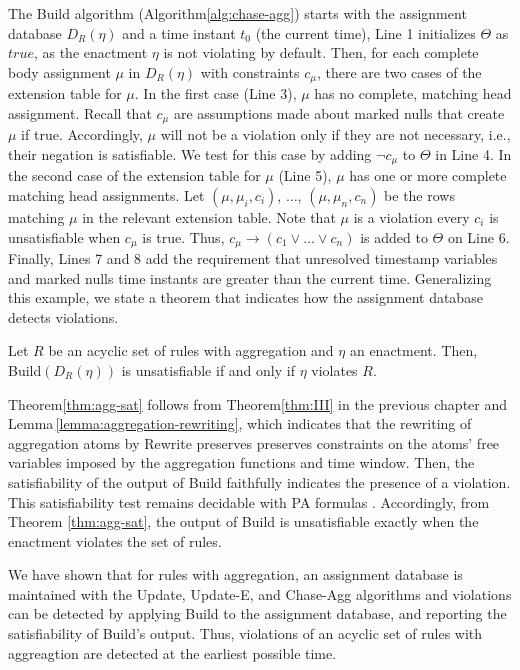 The {\sf Build} algorithm (Algorithm\:\ref{alg:chase-agg})
starts with the assignment database $D_{R}(\eta)$ 
and a time instant $t_0$ (the current time),
Line 1 initializes $\Theta$ as $true$,
as the enactment $\eta$ is not violating by default.
Then, for each complete body assignment $\mu$ in $D_{R}(\eta)$
with constraints $c_\mu$,
there are two cases of the extension table for $\mu$.
In the first case (Line 3),
$\mu$ has no complete, matching head assignment.
Recall that $c_\mu$ are assumptions made about marked nulls
that create $\mu$ if true.
Accordingly,
$\mu$ will not be a violation only if they are not necessary,
i.e., their negation is satisfiable.
We test for this case by adding $\neg c_\mu$ to $\Theta$ in Line 4.
In the second case of the extension table for $\mu$ (Line 5),
$\mu$ has one or more complete matching head assignments.
Let $(\mu,\mu_i,c_i)$, $\dots$, $(\mu,\mu_n,c_n)$
be the rows matching $\mu$ in the relevant extension table.
Note that $\mu$ is a violation
every $c_i$ is unsatisfiable when $c_\mu$ is true.
Thus, $c_\mu\rightarrow(c_1 \lor\dots\lor c_n)$
is added to $\Theta$ on Line 6.
Finally, Lines 7 and 8 add the requirement
that unresolved timestamp variables and marked nulls time instants
are greater than the current time.
Generalizing this example,
we state a theorem that indicates how the assignment database
detects violations.

\begin{thm}\label{thm:agg-sat}
    Let $R$ be an acyclic set of rules with aggregation
    and
    $\eta$ an enactment.
    Then,
    {\sf Build}$(D_R(\eta))$ is unsatisfiable
    if and only if $\eta$ violates $R$.
  \end{thm}

Theorem\:\ref{thm:agg-sat} follows from Theorem\:\ref{thm:III}
in the previous chapter
and Lemma\,\ref{lemma:aggregation-rewriting},
which indicates that the rewriting of aggregation atoms
by {\sf Rewrite}
preserves preserves constraints
on the atoms' free variables
imposed by the aggregation functions and time window.
Then,
the satisfiability of the output of {\sf Build}
faithfully indicates the presence of a violation.
This satisfiability test remains decidable with PA formulas \cite{stansifer1984presburger}.
Accordingly,
from Theorem \ref{thm:agg-sat},
the output of {\sf Build} is unsatisfiable
exactly
when the enactment violates the set of rules.

We have shown that
for rules with aggregation,
an assignment database is maintained
with the {\sf Update}, {\sf Update-E}, and {\sf Chase-Agg} algorithms
and violations can be detected by
applying {\sf Build} to the assignment database,
and reporting the satisfiability of {\sf Build}'s output.
Thus,
violations of an acyclic set of rules with aggreagtion 
are detected at the earliest possible time. 

